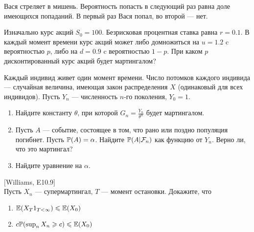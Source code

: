 \begin{problem}
Вася стреляет в мишень. Вероятность попасть в следующий раз равна доле имеющихся попаданий. В первый раз Вася попал, во второй — нет.

\begin{sol}

\end{sol}
\end{problem}

\begin{problem}
Изначально курс акций $S_{0}=100$. Безрисковая процентная ставка
равна $r=0.1$. В каждый момент времени курс акций может либо
домножиться на $u=1.2$ c вероятностью $p$, либо на $d=0.9$ c
вероятностью $1-p$. При каком $p$ дисконтированный курс акций
будет мартингалом?

\begin{sol}

\end{sol}
\end{problem}

\begin{problem}
Каждый индивид живет один момент времени. Число потомков каждого
индивида — случайная величина, имеющая закон распределения $X$
(одинаковый для всех индивидов). Пусть $Y_{n}$ — численность
$n$-го поколения, $Y_{0}=1$.
\begin{enumerate}
\item Найдите константу $\theta$, при которой
$G_{n}=\frac{Y_{n}}{\theta^{n}}$ будет мартингалом.
\item Пусть $A$ — событие, состоящее в том, что рано или поздно
популяция погибнет. Пусть $\P(A)=\alpha$. Найдите
$\P(A|\mathcal{F}_{n})$ как функцию от $Y_{n}$. Верно ли, что это
мартингал?
\item Найдите уравнение на $\alpha$.
\end{enumerate}

\begin{sol}

\end{sol}
\end{problem}

\begin{problem}
$[$Williams, E10.9$]$ \\
Пусть $X_{n}$ — супермартингал, $T$ — момент остановки. Докажите,
что
\begin{enumerate}
\item $\E(X_{T}1_{T<\infty})\le \E(X_{0})$
\item $c\P(\sup_{n} X_{n} \ge c)\le \E(X_{0})$
\end{enumerate}

\begin{sol}

\end{sol}
\end{problem}

